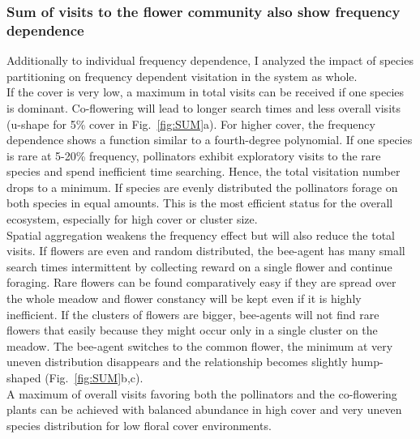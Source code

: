 \subsubsection*{Sum of visits to the flower community also show frequency dependence}
Additionally to individual frequency dependence, I analyzed the impact of species partitioning on frequency dependent visitation in the system as whole. \\
If the cover is very low, a maximum in total visits can be received if one species is dominant. Co-flowering will lead to longer search times and less overall visits (u-shape for 5\% cover in Fig.~\ref{fig:SUM}a). For higher cover, the frequency dependence shows a function similar to a fourth-degree polynomial. If one species is rare at 5-20\% frequency, pollinators exhibit exploratory visits to the rare species and spend inefficient time searching. Hence, the total visitation number drops to a minimum. If species are evenly distributed the pollinators forage on both species in equal amounts. This is the most efficient status for the overall ecosystem, especially for high cover or cluster size. \\
Spatial aggregation weakens the frequency effect but will also reduce the total visits. If flowers are even and random distributed, the bee-agent has many small search times intermittent by collecting reward on a single flower and continue foraging. Rare flowers can be found comparatively easy if they are spread over the whole meadow and flower constancy will be kept even if it is highly inefficient. If the clusters of flowers are bigger, bee-agents will not find rare flowers that easily because they might occur only in a single cluster on the meadow. The bee-agent switches to the common flower, the minimum at very uneven distribution disappears and the relationship becomes slightly hump-shaped (Fig.~\ref{fig:SUM}b,c). \\
A maximum of overall visits favoring both the pollinators and the co-flowering plants can be achieved with balanced abundance in high cover and very uneven species distribution for low floral cover environments. 

